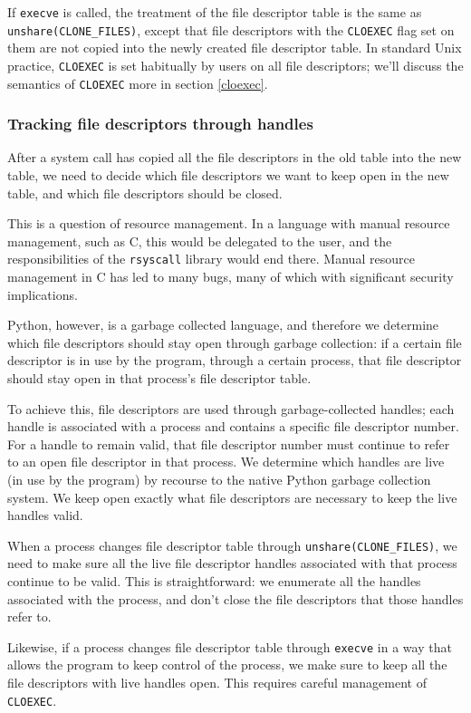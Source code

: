 \documentclass[sigplan]{acmart}
\begin{document}
If \texttt{execve} is called,
the treatment of the file descriptor table is the same as \verb|unshare(CLONE_FILES)|,
except that file descriptors with the \texttt{CLOEXEC} flag set on them
are not copied into the newly created file descriptor table.
In standard Unix practice, \texttt{CLOEXEC} is set habitually by users on all file descriptors;
we'll discuss the semantics of \texttt{CLOEXEC} more in section \ref{cloexec}.
\subsubsection{Tracking file descriptors through handles}
After a system call has copied all the file descriptors in the old table into the new table,
we need to decide which file descriptors we want to keep open in the new table,
and which file descriptors should be closed.

This is a question of resource management.
In a language with manual resource management,
such as C,
this would be delegated to the user,
and the responsibilities of the \texttt{rsyscall} library would end there.
Manual resource management in C has led to many bugs,
many of which with significant security implications.

Python, however, is a garbage collected language,
and therefore we determine which file descriptors should stay open through garbage collection:
if a certain file descriptor is in use by the program,
through a certain process,
that file descriptor should stay open in that process's file descriptor table.

To achieve this, file descriptors are used through garbage-collected handles;
each handle is associated with a process and contains a specific file descriptor number.
For a handle to remain valid,
that file descriptor number must continue to refer to an open file descriptor in that process.
We determine which handles are live (in use by the program)
by recourse to the native Python garbage collection system.
We keep open exactly what file descriptors are necessary to keep the live handles valid.

When a process changes file descriptor table through \verb|unshare(CLONE_FILES)|,
we need to make sure all the live file descriptor handles associated with that process continue to be valid.
This is straightforward:
we enumerate all the handles associated with the process,
and don't close the file descriptors that those handles refer to.

Likewise, if a process changes file descriptor table through \texttt{execve}
in a way that allows the program to keep control of the process,
we make sure to keep all the file descriptors with live handles open.
This requires careful management of \texttt{CLOEXEC}.
\end{document}
